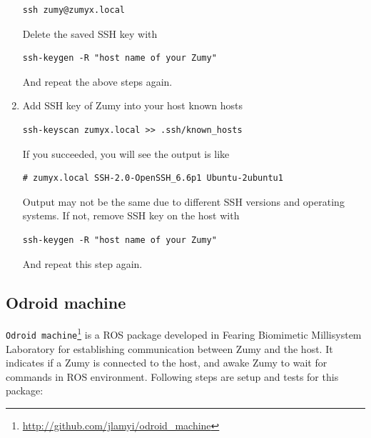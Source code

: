 \documentclass{article}
\begin{document}
\begin{enumerate}
\begin{Verbatim}[frame=single]
ssh zumy@zumyx.local
\end{Verbatim}
Delete the saved SSH key with
\begin{Verbatim}[frame=single]
ssh-keygen -R "host name of your Zumy"
\end{Verbatim}
And repeat the above steps again.
\item Add SSH key of Zumy into your host known hosts 
\begin{Verbatim}[frame=single]
ssh-keyscan zumyx.local >> .ssh/known_hosts
\end{Verbatim}
If you succeeded, you will see the output is like
\begin{Verbatim}[frame=single]
# zumyx.local SSH-2.0-OpenSSH_6.6p1 Ubuntu-2ubuntu1
\end{Verbatim}
Output may not be the same due to different SSH versions and operating systems. If not, remove SSH key on the host with
\begin{Verbatim}[frame=single]
ssh-keygen -R "host name of your Zumy"
\end{Verbatim}
And repeat this step again.
\end{enumerate}


\subsection{Odroid machine}
\verb=Odroid machine=\footnote{\url{http://github.com/jlamyi/odroid_machine}} is a ROS package developed in Fearing Biomimetic Millisystem Laboratory for establishing communication between Zumy and the host. It indicates if a Zumy is connected to the host, and awake Zumy to wait for commands in ROS environment. Following steps are setup and tests for this package:
\end{document}
